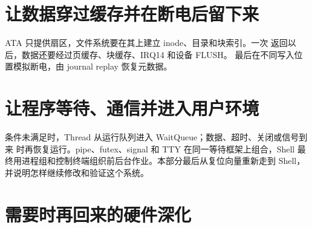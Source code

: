 \documentclass[UTF8,openany,zihao=5,fontset=none]{ctexbook}
\begin{document}
\part{让数据穿过缓存并在断电后留下来}
\begin{partbridge}
ATA 只提供扇区，文件系统要在其上建立 inode、目录和块索引。一次
 返回以后，数据还要经过页缓存、块缓存、IRQ14 和设备 FLUSH。
最后在不同写入位置模拟断电，由 journal replay 恢复元数据。
\end{partbridge}



\part{让程序等待、通信并进入用户环境}
\begin{partbridge}
条件未满足时，Thread 从运行队列进入 WaitQueue；数据、超时、关闭或信号到来
时再恢复运行。pipe、futex、signal 和 TTY 在同一等待框架上组合，Shell
最终用进程组和控制终端组织前后台作业。本部分最后从复位向量重新走到
Shell，并说明怎样继续修改和验证这个系统。
\end{partbridge}




\appendix
\part{需要时再回来的硬件深化}





\backmatter





\end{document}
